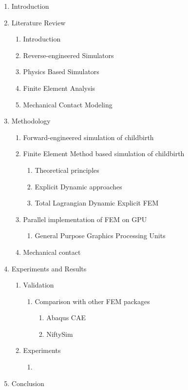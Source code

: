 \label{proposedstructure}

\begin{enumerate}
\item Introduction
\item Literature Review
  \begin{enumerate}
  \item Introduction
  \item Reverse-engineered Simulators
  \item Physics Based Simulators
  \item Finite Element Analysis
  \item Mechanical Contact Modeling
  \end{enumerate}
\item Methodology
  \begin{enumerate}
    \item Forward-engineered simulation of childbirth
    \item Finite Element Method based simulation of childbirth
    \begin{enumerate}
      \item Theoretical principles
      \item Explicit Dynamic approaches
      \item Total Lagrangian Dynamic Explicit FEM
    \end{enumerate}
    \item Parallel implementation of FEM on GPU
    \begin{enumerate}
      \item General Purpose Graphics Processing Units
    \end{enumerate}
    \item Mechanical contact
  \end{enumerate}
\item Experiments and Results
  \begin{enumerate}
    \item Validation
    \begin{enumerate}
      \item Comparison with other FEM packages
      \begin{enumerate}
        \item Abaqus CAE
        \item NiftySim
      \end{enumerate}
    \end{enumerate}
    \item Experiments
    \begin{enumerate}
      \item
    \end{enumerate}
  \end{enumerate}
\item Conclusion
\end{enumerate}
